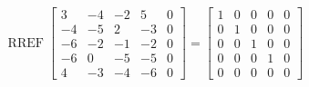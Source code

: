 \begin{exerciseAnswer} 


\[\operatorname{RREF} \left[\begin{array}{cccc|c}
3 & -4 & -2 & 5 & 0 \\
-4 & -5 & 2 & -3 & 0 \\
-6 & -2 & -1 & -2 & 0 \\
-6 & 0 & -5 & -5 & 0 \\
4 & -3 & -4 & -6 & 0
\end{array}\right] = \left[\begin{array}{cccc|c}
1 & 0 & 0 & 0 & 0 \\
0 & 1 & 0 & 0 & 0 \\
0 & 0 & 1 & 0 & 0 \\
0 & 0 & 0 & 1 & 0 \\
0 & 0 & 0 & 0 & 0
\end{array}\right] \]



\end{exerciseAnswer}
